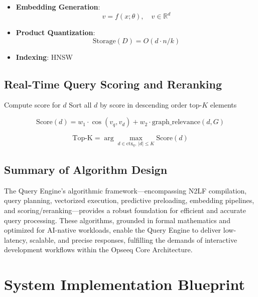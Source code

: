 \documentclass[11pt]{article}
\begin{document}
\begin{itemize}
    \item \textbf{Embedding Generation}:
    \[
    v = f(x; \theta),\quad v \in \mathbb{R}^d
    \]
    \item \textbf{Product Quantization}:
    \[
    \text{Storage}(D) = O(d \cdot n / k)
    \]
    \item \textbf{Indexing}: HNSW
\end{itemize}

\subsection{Real-Time Query Scoring and Reranking}
\label{subsec:scoring_reranking}

\begin{algorithm}
\caption{Query Scoring and Reranking}
\label{alg:scoring_reranking}
\begin{algorithmic}[1]
        \State Compute score for $d$
    \EndFor
    \State Sort all $d$ by score in descending order
    \State \Return top-$K$ elements
\EndFunction
\end{algorithmic}
\end{algorithm}


\[
\text{Score}(d) = w_1 \cdot \cos(v_q, v_d) + w_2 \cdot \text{graph\_relevance}(d, G)
\]

\[
\text{Top-K} = \arg\max_{d \in \text{ctx}_q,\ |d| \leq K} \text{Score}(d)
\]

\subsection{Summary of Algorithm Design}

The Query Engine’s algorithmic framework—encompassing N2LF compilation, query planning, vectorized execution, predictive preloading, embedding pipelines, and scoring/reranking—provides a robust foundation for efficient and accurate query processing. These algorithms, grounded in formal mathematics and optimized for AI-native workloads, enable the Query Engine to deliver low-latency, scalable, and precise responses, fulfilling the demands of interactive development workflows within the Opseeq Core Architecture.


\section{System Implementation Blueprint}
\label{sec:blueprint}
\end{document}
